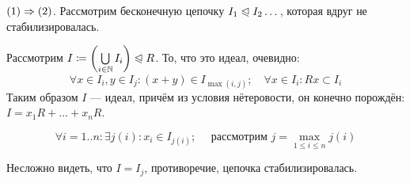 \documentclass[a4paper]{report}
\begin{document}
{{            \item $(1) \Rightarrow (2)$. Рассмотрим бесконечную цепочку $I_1 \trianglelefteqslant I_2 \dots$, которая вдруг не стабилизировалась.

            Рассмотрим $I \coloneqq \left(\bigcup\limits_{i \in \mathbb{N}}I_i\right) \trianglelefteqslant R$. То, что это идеал, очевидно:
            \[\forall x \in I_i, y \in I_j: (x + y) \in I_{\max(i,j)}; \quad \forall x \in I_i: Rx \subset I_i\]
            Таким образом $I$ --- идеал, причём из условия нётеровости, он конечно порождён: $I = x_1 R + \dots + x_n R$.

            \[\forall i = 1..n: \exists j(i) : x_i \in I_{j(i)};\quad \text{ рассмотрим } j = \max\limits_{1 \le i \le n}j(i)\]

            Несложно видеть, что $I = I_j$, противоречие, цепочка стабилизировалась.
        }
    }
\end{document}
